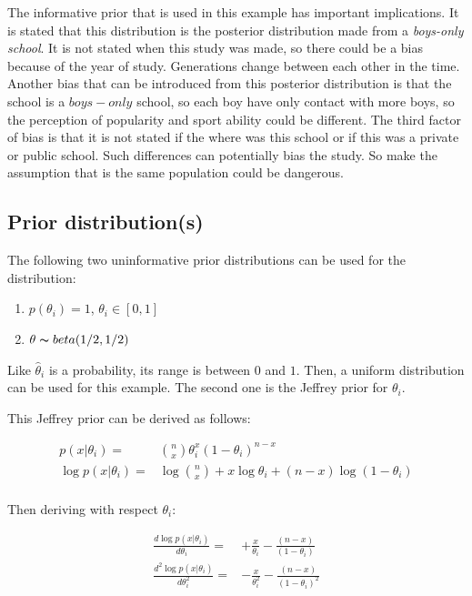 \documentclass{article}
\begin{document}
The informative prior that is used in this example has important implications. It is stated that this distribution is the posterior distribution made from a \textit{boys-only school}. It is not stated when this study was made, so there could be a bias because of the year of study. Generations change between each other in the time. Another bias that can be introduced from this posterior distribution is that the school is a $boys-only$ school, so each boy have only contact with more boys, so the perception of popularity and sport ability could be different. The third factor of bias is that it is not stated if the where was this school or if this was a private or public school. Such differences can potentially bias the study. So make the assumption that is the same population could be dangerous.

\subsection{Prior distribution(s)}

The following two uninformative prior distributions can be used for the distribution:

\begin{centering}
\begin{enumerate}
	\item{$p(\theta_i) = 1$, $\theta_i \in [0,1]$}
	\item{$\theta \thicksim beta(1/2, 1/2)$}
\end{enumerate}
\end{centering}

Like $\widehat{\theta}_i$ is a probability, its range is between $0$ and $1$. Then, a uniform distribution can be used for this example. The second one is the Jeffrey prior for $\theta_i$.

This Jeffrey prior can be derived as follows:

\begin{equation}
\begin{split}
	p(x|\theta_i) =& {n\choose x} \theta_i^x (1- \theta_i)^{n-x} \\
	\log p(x|\theta_i) =& \log {n\choose x} + x \log \theta_i + (n-x) \log (1-\theta_i) \\
\end{split}
\end{equation}

Then deriving with respect $\theta_i$:

\begin{equation}
\begin{split}
	\frac{d \log p(x|\theta_i)}{d\theta_i} =& +\frac{x}{\theta_i} - \frac{(n-x)}{(1-\theta_i)} \\
	\frac{d^2 \log p(x|\theta_i)}{d\theta_i^2} =& -\frac{x}{\theta_i^2} - \frac{(n-x)}{(1-\theta_i)^2} 
\end{split}
\end{equation}
\end{document}
